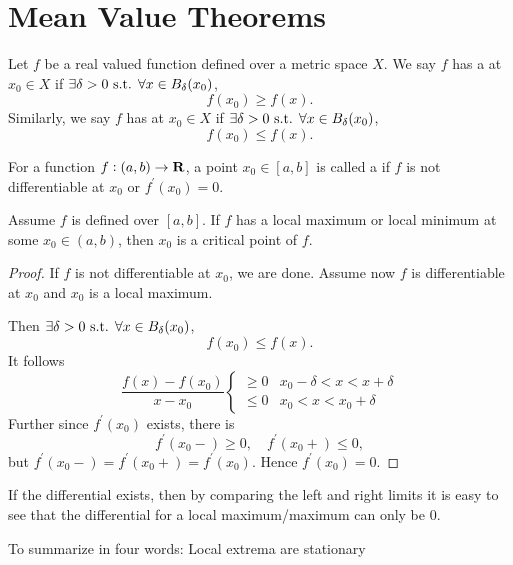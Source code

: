 \section{Mean Value Theorems}
\begin{definition}
Let $f$ be a real valued function defined over a metric space $X$. We say $f$ has a  at $x_0\in X$ if $\exists\delta>0\text{ s.t. }\forall x\in B_\delta(x_0)$,
\[ f(x_0)\ge f(x). \]
Similarly, we say $f$ has  at $x_0\in X$ if $\exists\delta>0\text{ s.t. }\forall x\in B_\delta(x_0)$,
\[ f(x_0)\le f(x). \]
\end{definition}

\begin{definition}
For a function $f:(a,b)\to\mathbf R$, a point $x_0\in[a,b]$ is called a  if $f$ is not differentiable at $x_0$ or $f^\prime(x_0)=0$.
\end{definition}

\begin{theorem}
Assume $f$ is defined over $[a,b]$. If $f$ has a local maximum or local minimum at some $x_0\in(a,b)$, then $x_0$ is a critical point of $f$.
\end{theorem}

\begin{proof}
If $f$ is not differentiable at $x_0$, we are done. Assume now $f$ is differentiable at $x_0$ and $x_0$ is a local maximum.

Then $\exists\delta>0\text{ s.t. }\forall x\in B_\delta(x_0)$,
\[ f(x_0)\le f(x). \]
It follows
\[ \frac{f(x)-f(x_0)}{x-x_0}\begin{cases}
\ge0 & x_0-\delta<x<x+\delta\\
\le0 & x_0<x<x_0+\delta
\end{cases} \]
Further since $f^\prime(x_0)$ exists, there is
\[ f^\prime(x_0-)\ge0, \quad f^\prime(x_0+)\le0, \]
but $f^\prime(x_0-)=f^\prime(x_0+)=f^\prime(x_0)$. Hence $f^\prime(x_0)=0.$
\end{proof}


\begin{theorem}
If the differential exists, then by comparing the left and right limits it is easy to see that the differential for a local maximum/maximum can only be $0$.

To summarize in four words: Local extrema are stationary
\end{theorem}

